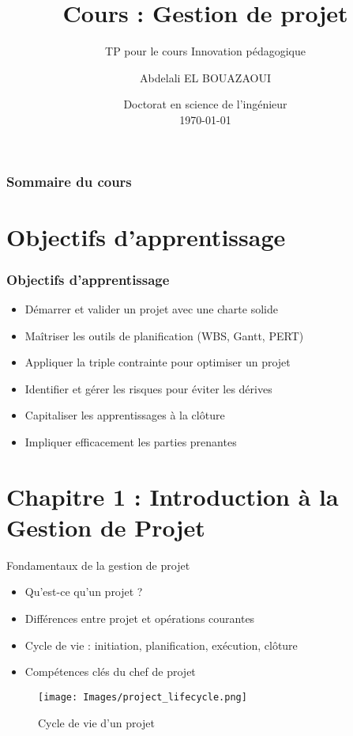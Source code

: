 \documentclass[11pt]{beamer}
\title[Cours Gestion de Projet]{Cours : Gestion de projet}
\subtitle{TP pour le cours Innovation pédagogique}
\author[Abdelali EL BOUAZAOUI]{Abdelali EL BOUAZAOUI}
\institute[UC]{Université Hassan II \\ \smallskip \textit{a.elbouazaoui@gmail.com}}
\date[\today]{Doctorat en science de l'ingénieur \\ \today}
\begin{document}
\begin{frame}
  \titlepage
\end{frame}

\begin{frame}
  \frametitle{Sommaire du cours}
  \tableofcontents
\end{frame}

\section*{Objectifs d'apprentissage}
\begin{frame}
  \frametitle{Objectifs d'apprentissage}
  \pause
  \begin{itemize}
    \item Démarrer et valider un projet avec une charte solide \pause
    \item Maîtriser les outils de planification (WBS, Gantt, PERT) \pause
    \item Appliquer la triple contrainte pour optimiser un projet \pause
    \item Identifier et gérer les risques pour éviter les dérives \pause
    \item Capitaliser les apprentissages à la clôture \pause
    \item Impliquer efficacement les parties prenantes
  \end{itemize}
\end{frame}


\section{Chapitre 1 : Introduction à la Gestion de Projet}
\begin{frame}{Fondamentaux de la gestion de projet}
  \pause
  \begin{itemize}
    \item Qu'est-ce qu'un projet ? \pause
    \item Différences entre projet et opérations courantes \pause
    \item Cycle de vie : initiation, planification, exécution, clôture \pause
    \item Compétences clés du chef de projet
  \end{itemize}
  \begin{figure}\centering
    \texttt{[image: Images/project\_lifecycle.png]}
    \caption{Cycle de vie d'un projet}
  \end{figure}
\end{frame}
\end{document}
